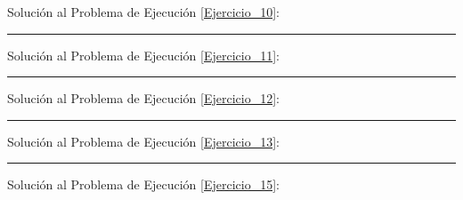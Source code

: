 \documentclass[12pt, letter]{exam}
\begin{document}
Solución al Problema de Ejecución \ref{Ejercicio_10}:

\vspace*{3.5cm}
\rule{0.9\textwidth}{0.3mm}

Solución al Problema de Ejecución \ref{Ejercicio_11}:

\vspace*{3.5cm}
\rule{0.9\textwidth}{0.3mm}

Solución al Problema de Ejecución \ref{Ejercicio_12}:

\vspace*{3.5cm}
\rule{0.9\textwidth}{0.3mm}

Solución al Problema de Ejecución \ref{Ejercicio_13}:

\vspace*{3.5cm}
\rule{0.9\textwidth}{0.3mm}




Solución al Problema de Ejecución \ref{Ejercicio_15}:
\end{document}
